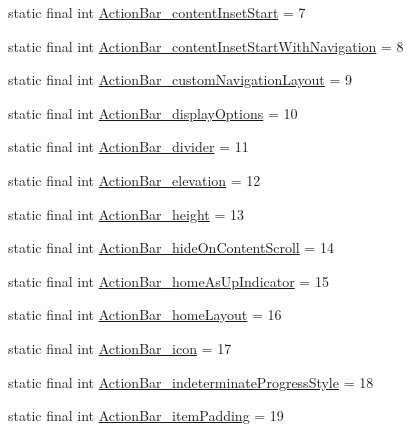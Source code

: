 \begin{DoxyCompactItemize}
\item 
static final int \mbox{\hyperlink{classandroid_1_1support_1_1design_1_1_r_1_1styleable_abe343991a1e2e98a7183e8c6eebd614b}{Action\+Bar\+\_\+content\+Inset\+Start}} = 7
\item 
static final int \mbox{\hyperlink{classandroid_1_1support_1_1design_1_1_r_1_1styleable_a27ded1b66c4b7c5d8c3a45644eba898f}{Action\+Bar\+\_\+content\+Inset\+Start\+With\+Navigation}} = 8
\item 
static final int \mbox{\hyperlink{classandroid_1_1support_1_1design_1_1_r_1_1styleable_a7975163cf45e5585902650dd73ecd484}{Action\+Bar\+\_\+custom\+Navigation\+Layout}} = 9
\item 
static final int \mbox{\hyperlink{classandroid_1_1support_1_1design_1_1_r_1_1styleable_a6f604fed60ddc6a45aa98849c31788bd}{Action\+Bar\+\_\+display\+Options}} = 10
\item 
static final int \mbox{\hyperlink{classandroid_1_1support_1_1design_1_1_r_1_1styleable_aaf3a278fd3f4729132be824d0ccd6914}{Action\+Bar\+\_\+divider}} = 11
\item 
static final int \mbox{\hyperlink{classandroid_1_1support_1_1design_1_1_r_1_1styleable_a23e7136e98075fbe16fdbf2b19080dc7}{Action\+Bar\+\_\+elevation}} = 12
\item 
static final int \mbox{\hyperlink{classandroid_1_1support_1_1design_1_1_r_1_1styleable_a702cb201f72c8da487b2869a2bd86b42}{Action\+Bar\+\_\+height}} = 13
\item 
static final int \mbox{\hyperlink{classandroid_1_1support_1_1design_1_1_r_1_1styleable_a261ec0d365bc8162f615ed81423a77e9}{Action\+Bar\+\_\+hide\+On\+Content\+Scroll}} = 14
\item 
static final int \mbox{\hyperlink{classandroid_1_1support_1_1design_1_1_r_1_1styleable_a3010eaac8b9883587c5049e15ea710d4}{Action\+Bar\+\_\+home\+As\+Up\+Indicator}} = 15
\item 
static final int \mbox{\hyperlink{classandroid_1_1support_1_1design_1_1_r_1_1styleable_aaa951a80ce9e4bbadcf2d03f00bd60b9}{Action\+Bar\+\_\+home\+Layout}} = 16
\item 
static final int \mbox{\hyperlink{classandroid_1_1support_1_1design_1_1_r_1_1styleable_a28380a802fb7d59c57cd13a3ca1ffa00}{Action\+Bar\+\_\+icon}} = 17
\item 
static final int \mbox{\hyperlink{classandroid_1_1support_1_1design_1_1_r_1_1styleable_a34717e6304c2b1241956a70a63b86248}{Action\+Bar\+\_\+indeterminate\+Progress\+Style}} = 18
\item 
static final int \mbox{\hyperlink{classandroid_1_1support_1_1design_1_1_r_1_1styleable_aa4a6a8d1dc6b22f185af3d564ace3333}{Action\+Bar\+\_\+item\+Padding}} = 19

\end{DoxyCompactItemize}
